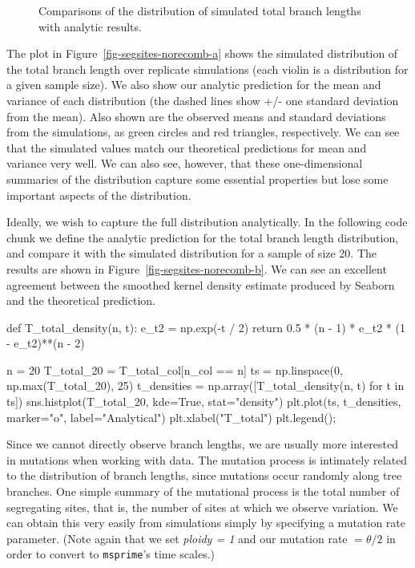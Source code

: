 \documentclass[graybox]{svmult}
\newcommand{\msprime}[0]{\texttt{msprime}}
\begin{document}
\begin{figure}[t]
\centering
{}
\qquad\qquad
{}
\caption{\label{fig-segsites-norecomb}
Comparisons of the distribution of simulated total branch lengths
with analytic results.
}
\end{figure}

    The plot in Figure~\ref{fig-segsites-norecomb-a} shows the simulated
distribution of the total branch length
over replicate simulations (each violin is a distribution for a given
sample size). We also show our analytic prediction for the mean and
variance of each distribution (the dashed lines show +/- one standard
deviation from the mean). Also shown are the observed means and standard
deviations from the simulations, as green circles and red triangles,
respectively. We can see that the simulated values match our theoretical
predictions for mean and variance very well. We can also see, however,
that these one-dimensional summaries of the distribution capture some
essential properties but lose some important aspects of the
distribution.

    Ideally, we wish to capture the full distribution analytically. In the following code chunk we define the analytic
prediction for the total branch length distribution, and compare it with the simulated distribution for a sample of size 20. The results are shown in
Figure~\ref{fig-segsites-norecomb-b}. We can see an excellent agreement between
the smoothed kernel
density estimate produced by Seaborn and the theoretical prediction.

\begin{pythoncode}
def T_total_density(n, t):
    e_t2 = np.exp(-t / 2)
    return 0.5 * (n - 1) * e_t2 * (1 - e_t2)**(n - 2)

n = 20
T_total_20 = T_total_col[n_col == n]
ts = np.linspace(0, np.max(T_total_20), 25)
t_densities = np.array([T_total_density(n, t) for t in ts])
sns.histplot(T_total_20, kde=True, stat="density")
plt.plot(ts, t_densities, marker="o", label="Analytical")
plt.xlabel("T_total")
plt.legend();
\end{pythoncode}

Since we cannot directly observe branch lengths, we are usually more
interested in mutations when working with data. The mutation process is
intimately related to the distribution of branch lengths, since
mutations occur randomly along tree branches. One simple summary of the
mutational process is the total number of segregating sites, that is, the number of
sites at which we observe variation. We can obtain this very
easily from simulations simply by specifying a mutation rate parameter.
(Note again that we set \emph{ploidy = 1} and our mutation rate
\(= \theta / 2\) in order to convert to \msprime's time scales.)
\end{document}
